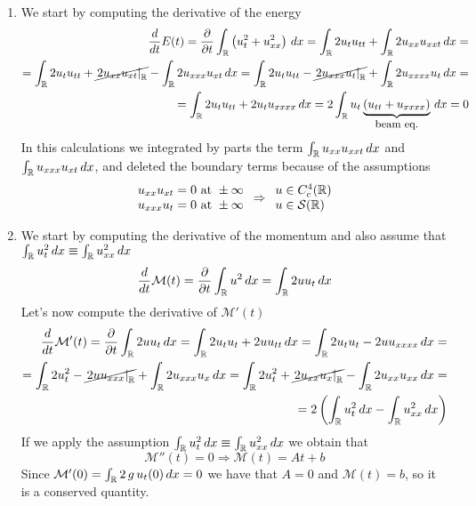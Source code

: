 \begin{enumerate}
    \item We start by computing the derivative of the energy
    \[
        \begin{split}
            \frac{d}{dt} E(t) = \frac{\partial}{\partial t} \int_{\mathbb{R}} \left( u_t^2 + u_{xx}^2 \right) \, dx = \int_{\mathbb{R}} 2u_t u_{tt} + \int_{\mathbb{R}} 2u_{xx} u_{xxt} \, dx = \\ = \int_{\mathbb{R}} 2u_t u_{tt} + \cancel{\left. 2 u_{xx} u_{xt} \right|_{\mathbb{R}}} - \int_{\mathbb{R}} 2u_{xxx} u_{xt} \, dx = \int_{\mathbb{R}} 2u_t u_{tt} - \cancel{\left. 2 u_{xxx} u_t \right|_{\mathbb{R}}} + \int_{\mathbb{R}} 2 u_{xxxx} u_t \, dx = \\
            = \int_{\mathbb{R}} 2u_t u_{tt} + 2 u_t u_{xxxx} \, dx = 2 \int_{\mathbb{R}} u_t \underbrace{\left( u_{tt} + u_{xxxx} \right)}_{\text{\small beam eq.}} \, dx = 0 
        \end{split}    
    \]
    In this calculations we integrated by parts the term \(\int_{\mathbb{R}} u_{xx} u_{xxt} \, dx\) and \(\int_{\mathbb{R}} u_{xxx} u_{xt} \, dx\), and deleted the boundary terms because of the assumptions
    \[
        \begin{array}{l}
            u_{xx} u_{xt} = 0 \text{ at } \pm \infty \\
            u_{xxx} u_t = 0 \text{ at } \pm \infty
        \end{array}
        \Rightarrow \begin{array}{l}
            u  \in C^4_c(\mathbb{R}) \\
            u \in \mathcal{S}(\mathbb{R})
        \end{array}
    \]
    \item We start by computing the derivative of the momentum and also assume that \(\int_{\mathbb{R}} u_{t}^2 \, dx \equiv \int_{\mathbb{R}} u_{xx}^2 \, dx\)
    \[
        \begin{split}
            \frac{d}{dt} \mathcal{M}(t) = \frac{\partial}{\partial t} \int_{\mathbb{R}} u^2 \, dx = \int_{\mathbb{R}} 2 u u_t \, dx
        \end{split}
    \]
    Let's now compute the derivative of \(\mathcal{M}'(t)\)
    \[
        \begin{split}
            \frac{d}{dt} \mathcal{M}'(t) = \frac{\partial}{\partial t} \int_{\mathbb{R}} 2 u u_t \, dx = \int_{\mathbb{R}} 2 u_t u_t + 2 u u_{tt} \, dx = \int_{\mathbb{R}} 2 u_t u_t - 2 u u_{xxxx} \, dx = \\
            = \int_{\mathbb{R}} 2 u_t^2 - \cancel{\left. 2 u u_{xxx} \right|_{\mathbb{R}}} + \int_{\mathbb{R}} 2 u_{xxx} u_x \, dx = \int_{\mathbb{R}} 2 u_t^2 + \cancel{\left. 2 u_{xx} u_x \right|_{\mathbb{R}}} - \int_{\mathbb{R}} 2 u_{xx} u_{xx} \, dx = \\  
            = 2 \left(\int_{\mathbb{R}} u_t^2 \, dx - \int_{\mathbb{R}} u_{xx}^2 \, dx \right)
        \end{split}
    \]
    If we apply the assumption \(\int_{\mathbb{R}} u_{t}^2 \, dx \equiv \int_{\mathbb{R}} u_{xx}^2 \, dx\) we obtain that 
    \[
        \mathcal{M}''(t) = 0 \Rightarrow \mathcal{M}(t) = At + b
    \]
    Since \(\mathcal{M}'(0) = \int_{\mathbb{R}} 2\,  g \,u_t(0) \, dx = 0\) we have that \(A = 0\) and \(\mathcal{M}(t) = b\), so it is a conserved quantity.
\end{enumerate}

